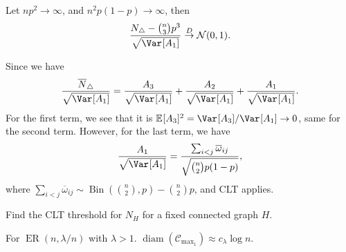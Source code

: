 \begin{claim}
	Let \(np^2 \to \infty \), and \(n^2 p(1 - p) \to \infty \), then
	\[
		\frac{N_{\triangle} - \binom{n}{3}p^3}{\sqrt{\Var_{}[A_1] } }
		\overset{D}{\to} \mathcal{N} (0, 1).
	\]
\end{claim}
\begin{explanation}
	Since we have
	\[
		\frac{\overline{N} _{\triangle}}{\sqrt{\Var_{}[A_1] } }
		= \frac{A_3}{\sqrt{\Var_{}[A_1] } } + \frac{A_2}{\sqrt{\Var_{}[A_1] } } + \frac{A_1}{\sqrt{\Var_{}[A_1] } }.
	\]
	For the first term, we see that it is \(\mathbb{E}_{}[A_3] ^2 = \Var_{}[A_3] / \Var_{}[A_1] \to 0\), same for the second term. However, for the last term, we have
	\[
		\frac{A_1}{\sqrt{\Var_{}[A_1] } }
		= \frac{\sum_{i < j} \overline{\omega }_{ij} }{\sqrt{\binom{n}{2} p (1 - p)} },
	\]
	where \(\sum_{i < j} \overline{\omega }_{ij} \sim \operatorname{Bin}(\binom{n}{2}, p) - \binom{n}{2}p \), and CLT applies.
\end{explanation}

\begin{exercise}
	Find the CLT threshold for \(N_H\) for a fixed connected graph \(H\).
\end{exercise}

\begin{theorem}
	For \(\operatorname{ER}(n, \lambda / n) \) with \(\lambda > 1\). \(\operatorname{diam}(\mathcal{C} _{\max _1}) \approx c_\lambda \log n\).
\end{theorem}